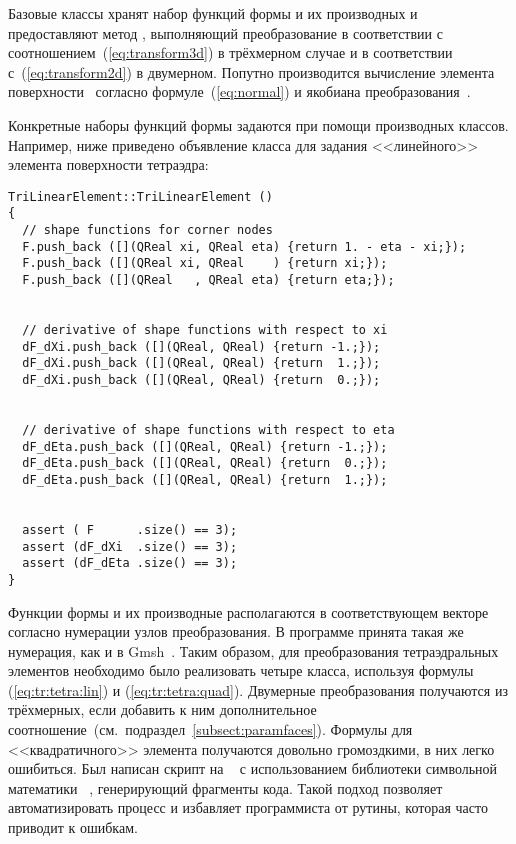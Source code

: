 Базовые классы хранят набор функций формы и их производных и предоставляют метод , выполняющий преобразование в соответствии с соотношением~(\ref{eq:transform3d}) в трёхмерном случае и в соответствии с~(\ref{eq:transform2d}) в двумерном. Попутно производится вычисление элемента поверхности~ согласно формуле~(\ref{eq:normal}) и якобиана преобразования~.

Конкретные наборы функций формы задаются при помощи производных классов. Например, ниже приведено объявление класса для задания <<линейного>> элемента поверхности тетраэдра:
\begin{verbatim}
TriLinearElement::TriLinearElement ()
{
  // shape functions for corner nodes
  F.push_back ([](QReal xi, QReal eta) {return 1. - eta - xi;});
  F.push_back ([](QReal xi, QReal    ) {return xi;});
  F.push_back ([](QReal   , QReal eta) {return eta;});


  // derivative of shape functions with respect to xi
  dF_dXi.push_back ([](QReal, QReal) {return -1.;});
  dF_dXi.push_back ([](QReal, QReal) {return  1.;});
  dF_dXi.push_back ([](QReal, QReal) {return  0.;});


  // derivative of shape functions with respect to eta
  dF_dEta.push_back ([](QReal, QReal) {return -1.;});
  dF_dEta.push_back ([](QReal, QReal) {return  0.;});
  dF_dEta.push_back ([](QReal, QReal) {return  1.;});


  assert ( F      .size() == 3);
  assert (dF_dXi  .size() == 3);
  assert (dF_dEta .size() == 3);
}
\end{verbatim}

Функции формы и их производные располагаются в соответствующем векторе согласно нумерации узлов преобразования. В программе принята такая же нумерация, как и в Gmsh~\cite{Gmsh}. Таким образом, для преобразования тетраэдральных элементов необходимо было реализовать четыре класса, используя формулы (\ref{eq:tr:tetra:lin}) и (\ref{eq:tr:tetra:quad}). Двумерные преобразования получаются из трёхмерных, если добавить к ним дополнительное соотношение~(см.~подраздел~\ref{subsect:paramfaces}). Формулы для <<квадратичного>> элемента получаются довольно громоздкими, в них легко ошибиться. Был написан скрипт на ~\cite{Python} с использованием библиотеки символьной математики ~\cite{SymPy}, генерирующий фрагменты кода. Такой подход позволяет автоматизировать процесс и избавляет программиста от рутины, которая часто приводит к ошибкам.



